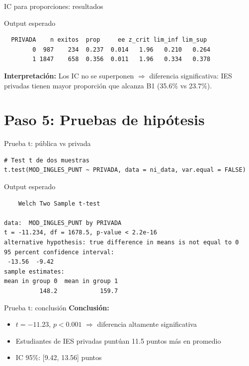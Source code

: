 \documentclass[aspectratio=169, 11pt]{beamer}
\begin{document}
\begin{frame}[fragile]{IC para proporciones: resultados}
\begin{exampleblock}{Output esperado}
\small
\begin{verbatim}
  PRIVADA    n exitos  prop     ee z_crit lim_inf lim_sup
        0  987    234  0.237  0.014   1.96   0.210   0.264
        1 1847    658  0.356  0.011   1.96   0.334   0.378
\end{verbatim}
\end{exampleblock}

\vspace{0.3cm}
\textbf{Interpretación:}
Los IC no se superponen $\Rightarrow$ diferencia significativa: IES privadas tienen mayor proporción que alcanza B1 (35.6\% vs 23.7\%).
\end{frame}

\section{Paso 5: Pruebas de hipótesis}

\begin{frame}[fragile]{Prueba t: pública vs privada}
\begin{lstlisting}
# Test t de dos muestras
t.test(MOD_INGLES_PUNT ~ PRIVADA, data = ni_data, var.equal = FALSE)
\end{lstlisting}

\vspace{0.2cm}
\begin{exampleblock}{Output esperado}
\small
\begin{verbatim}
    Welch Two Sample t-test

data:  MOD_INGLES_PUNT by PRIVADA
t = -11.234, df = 1678.5, p-value < 2.2e-16
alternative hypothesis: true difference in means is not equal to 0
95 percent confidence interval:
 -13.56  -9.42
sample estimates:
mean in group 0  mean in group 1
          148.2            159.7
\end{verbatim}
\end{exampleblock}
\end{frame}

\begin{frame}{Prueba t: conclusión}
\textbf{Conclusión:}
\begin{itemize}
\item $t = -11.23$, $p < 0.001$ $\Rightarrow$ diferencia altamente significativa
\item Estudiantes de IES privadas puntúan 11.5 puntos más en promedio
\item IC 95\%: [9.42, 13.56] puntos
\end{itemize}
\end{frame}
\end{document}
